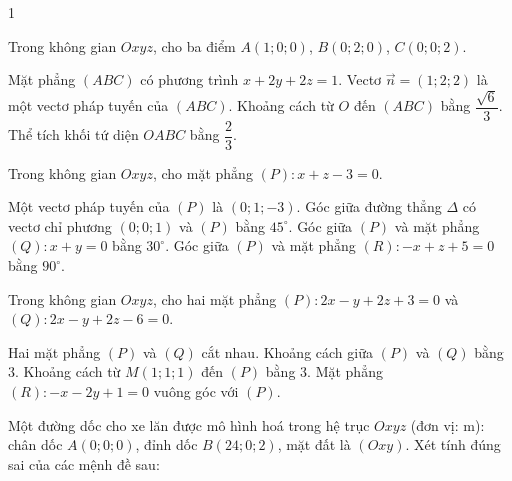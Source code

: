 \begin{deontap}{1}
\begin{cau}
\end{cau}
\phanII
\begin{cau}Trong không gian $Oxyz$, cho ba điểm $A(1;0;0)$, $B(0;2;0)$, $C(0;0;2)$.
\begin{dungsai}
  \y Mặt phẳng $(ABC)$ có phương trình $x+2y+2z=1$. \oDS
  \y Vectơ $\vec n=(1;2;2)$ là một vectơ pháp tuyến của $(ABC)$. \oDS
  \y Khoảng cách từ $O$ đến $(ABC)$ bằng $\dfrac{\sqrt{6}}{3}$. \oDS
  \y Thể tích khối tứ diện $OABC$ bằng $\dfrac{2}{3}$. \oDS
\end{dungsai}
\end{cau}
\begin{cau}Trong không gian $Oxyz$, cho mặt phẳng $(P)\colon x+z-3=0$.
\begin{dungsai}
  \y Một vectơ pháp tuyến của $(P)$ là $(0;1;-3)$. \oDS
  \y Góc giữa đường thẳng $\Delta$ có vectơ chỉ phương $(0;0;1)$ và $(P)$ bằng $45^\circ$. \oDS
  \y Góc giữa $(P)$ và mặt phẳng $(Q)\colon x+y=0$ bằng $30^\circ$. \oDS
  \y Góc giữa $(P)$ và mặt phẳng $(R)\colon -x+z+5=0$ bằng $90^\circ$. \oDS
\end{dungsai}
\end{cau}
\begin{cau}Trong không gian $Oxyz$, cho hai mặt phẳng $(P)\colon 2x-y+2z+3=0$ và $(Q)\colon 2x-y+2z-6=0$.
\begin{dungsai}
  \y Hai mặt phẳng $(P)$ và $(Q)$ cắt nhau. \oDS
  \y Khoảng cách giữa $(P)$ và $(Q)$ bằng $3$. \oDS
  \y Khoảng cách từ $M(1;1;1)$ đến $(P)$ bằng $3$. \oDS
  \y Mặt phẳng $(R)\colon -x-2y+1=0$ vuông góc với $(P)$. \oDS
\end{dungsai}
\end{cau}
\begin{cau}Một đường dốc cho xe lăn được mô hình hoá trong hệ trục $Oxyz$ (đơn vị: m): chân dốc $A(0;0;0)$, đỉnh dốc $B(24;0;2)$, mặt đất là $(Oxy)$. Xét tính đúng sai của các mệnh đề sau:


\end{cau}
\end{deontap}
